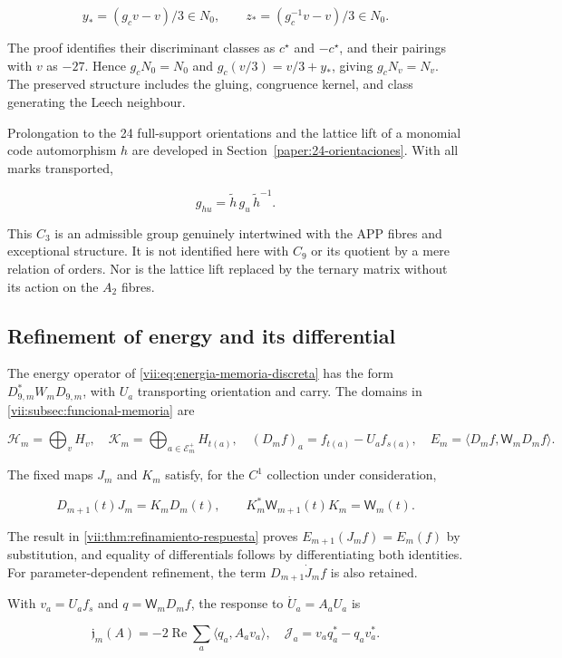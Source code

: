 \[
y_*=(g_cv-v)/3\in N_0,\qquad
z_*=(g_c^{-1}v-v)/3\in N_0.
\]

The proof identifies their discriminant classes as \(c^\star\) and \(-c^\star\), and their pairings with \(v\) as \(-27\). Hence \(g_cN_0=N_0\) and \(g_c(v/3)=v/3+y_*\), giving \(g_cN_v=N_v\). The preserved structure includes the gluing, congruence kernel, and class generating the Leech neighbour.

Prolongation to the 24 full-support orientations and the lattice lift of a monomial code automorphism \(h\) are developed in Section~\ref{paper:24-orientaciones}. With all marks transported,

\[
g_{hu}=\widetilde h\,g_u\,\widetilde h^{-1}.
\]

This \(C_3\) is an admissible group genuinely intertwined with the APP fibres and exceptional structure. It is not identified here with \(C_9\) or its quotient by a mere relation of orders. Nor is the lattice lift replaced by the ternary matrix without its action on the \(A_2\) fibres.

\subsection{Refinement of energy and its differential}
\label{paper:refinamiento-energia}

The energy operator of \eqref{vii:eq:energia-memoria-discreta} has the form \(D_{9,m}^*W_mD_{9,m}\), with \(U_a\) transporting orientation and carry. The domains in \cref{vii:subsec:funcional-memoria} are

\[
\mathcal H_m=\bigoplus_vH_v,\quad
\mathcal K_m=\bigoplus_{a\in\mathcal E_m^+}H_{t(a)},\quad
(D_mf)_a=f_{t(a)}-U_af_{s(a)},\quad
E_m=\langle D_mf,\mathsf W_mD_mf\rangle.
\]

The fixed maps \(J_m\) and \(K_m\) satisfy, for the \(C^1\) collection under consideration,

\[
D_{m+1}(t)J_m=K_mD_m(t),\qquad
K_m^*\mathsf W_{m+1}(t)K_m=\mathsf W_m(t).
\]

The result in \cref{vii:thm:refinamiento-respuesta} proves \(E_{m+1}(J_mf)=E_m(f)\) by substitution, and equality of differentials follows by differentiating both identities. For parameter-dependent refinement, the term \(D_{m+1}\dot J_mf\) is also retained.

With \(v_a=U_af_s\) and \(q=\mathsf W_mD_mf\), the response to \(\dot U_a=A_aU_a\) is

\[
\mathfrak j_m(A)=-2\operatorname{Re}\sum_a\langle q_a,A_av_a\rangle,
\quad \mathcal J_a=v_aq_a^*-q_av_a^*.
\]


